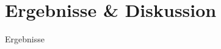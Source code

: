 \EnableTitleSlide
\section{Ergebnisse \& Diskussion}

\begin{frame}{Ergebnisse}
    
\end{frame}



